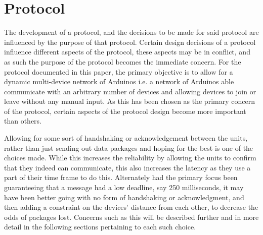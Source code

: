 \section{Protocol}
The development of a protocol, and the decisions to be made for said protocol are influenced by the purpose of that protocol.
Certain design decisions of a protocol influence different aspects of the protocol, these aspects may be in conflict, and as such the purpose of the protocol becomes the immediate concern.
For the protocol documented in this paper, the primary objective is to allow for a dynamic multi-device network of Arduinos i.e. a network of Arduinos able communicate with an arbitrary number of devices and allowing devices to join or leave without any manual input.
As this has been chosen as the primary concern of the protocol, certain aspects of the protocol design become more important than others.

\bigskip \noindent
Allowing for some sort of handshaking or acknowledgement between the units, rather than just sending out data packages and hoping for the best is one of the choices made.
While this increases the reliability by allowing the units to confirm that they indeed can communicate, this also increases the latency as they use a part of their time frame to do this.
Alternately had the primary focus been guaranteeing that a message had a low deadline, say 250 milliseconds, it may have been better going with no form of handshaking or acknowledgment, and then adding a constraint on the devices' distance from each other, to decrease the odds of packages lost.
Concerns such as this will be described further and in more detail in the following sections pertaining to each such choice.

